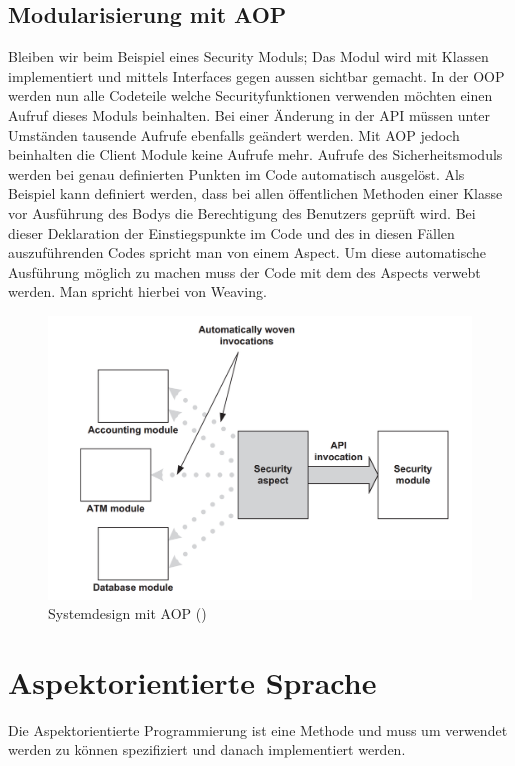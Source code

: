 \subsection{Modularisierung mit AOP}
\label{sec:aop_modaop}
Bleiben wir beim Beispiel eines Security Moduls; Das Modul wird mit Klassen implementiert und mittels Interfaces gegen aussen sichtbar gemacht. In der OOP werden nun alle Codeteile welche Securityfunktionen verwenden möchten einen Aufruf dieses Moduls beinhalten. Bei einer Änderung in der API müssen unter Umständen tausende Aufrufe ebenfalls geändert werden. Mit AOP jedoch beinhalten die Client Module keine Aufrufe mehr. Aufrufe des Sicherheitsmoduls werden bei genau definierten Punkten im Code automatisch ausgelöst. Als Beispiel kann definiert werden, dass bei allen öffentlichen Methoden einer Klasse vor Ausführung des Bodys die Berechtigung des Benutzers geprüft wird. Bei dieser Deklaration der Einstiegspunkte im Code und des in diesen Fällen auszuführenden Codes spricht man von einem Aspect. Um diese automatische Ausführung möglich zu machen muss der Code mit dem des Aspects verwebt werden. Man spricht hierbei von Weaving.
\begin{figure}[H]
	\centering
		\includegraphics[scale=0.5]{bilder/motivationAop.png}
	\caption{Systemdesign mit AOP (\cite[p~55]{laddad:aspectj})}
	\label{fig:motivationaop}
\end{figure}

\section{Aspektorientierte Sprache}
\label{sec:aop_lang}
Die Aspektorientierte Programmierung ist eine Methode und muss um verwendet werden zu können spezifiziert und danach implementiert werden.
